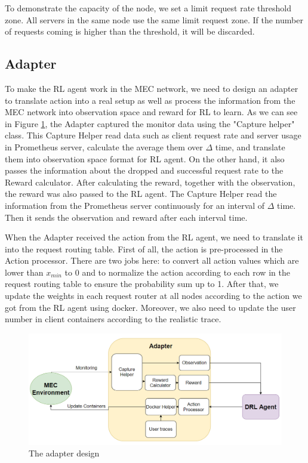 \documentclass[conference]{IEEEtran}
\begin{document}
To demonstrate the capacity of the node, we set a limit request rate threshold zone. All servers in the same node use the same limit request zone. If the number of requests coming is higher than the threshold, it will be discarded. 

\subsection{Adapter}

To make the RL agent work in the MEC network, we need to design an adapter to translate action into a real setup as well as process the information from the MEC network into observation space and reward for RL to learn. As we can see in Figure \ref{fig:metro_network_adapter}, the Adapter captured the monitor data using the "Capture helper" class. This Capture Helper read data such as client request rate and server usage in Prometheus server, calculate the average them over $\Delta$ time, and translate them into observation space format for RL agent. On the other hand, it also passes the information about the dropped and successful request rate to the Reward calculator. After calculating the reward, together with the observation, the reward was also passed to the RL agent. The Capture Helper read the information from the Prometheus server continuously for an interval of $\Delta$ time. Then it sends the observation and reward after each interval time. 

When the Adapter received the action from the RL agent, we need to translate it into the request routing table. First of all, the action is pre-processed in the Action processor. There are two jobs here: to convert all action values which are lower than $x_{min}$ to 0 and to normalize the action according to each row in the request routing table to ensure the probability sum up to 1. After that, we update the weights in each request router at all nodes according to the action we got from the RL agent using docker. Moreover, we also need to update the user number in client containers according to the realistic trace. 

\begin{figure}[]
    \centering
    \includegraphics[scale = 0.28]{imgs/metro_network_adapter.png}
    \caption{The adapter design}
    \label{fig:metro_network_adapter}
\end{figure}
\end{document}
